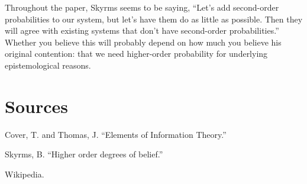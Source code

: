 \documentclass[letterpaper,12pt]{article}
\begin{document}
Throughout the paper, Skyrms seems to be saying, ``Let's add second-order probabilities to our system, but let's have them do as little as possible. Then they will agree with existing systems that don't have second-order probabilities.'' Whether you believe this will probably depend on how much you believe his original contention: that we need higher-order probability for underlying epistemological reasons.

\section{Sources}

Cover, T. and Thomas, J. ``Elements of Information Theory.''

Skyrms, B. ``Higher order degrees of belief.''

Wikipedia.
\end{document}
